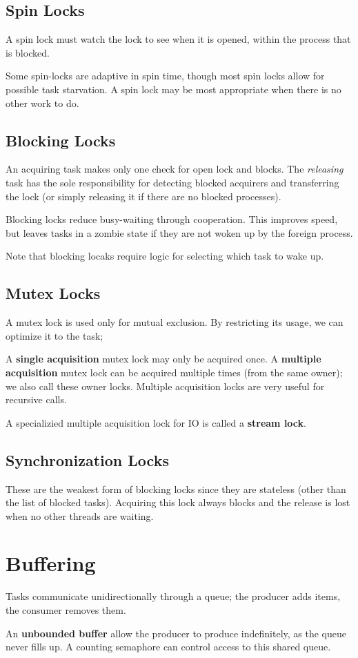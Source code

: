 \documentclass[12pt]{article}
\begin{document}
\subsection{Spin Locks}
A spin lock must watch the lock to see when it is opened, within the process that is blocked.

Some spin-locks are adaptive in spin time, though most spin locks allow for possible task starvation. A spin lock may be most appropriate when there is no other work to do.

\subsection{Blocking Locks}
An acquiring task makes only one check for open lock and blocks. The \textit{releasing} task has the sole responsibility for detecting blocked acquirers and transferring the lock (or simply releasing it if there are no blocked processes).

Blocking locks reduce busy-waiting through cooperation. This improves speed, but leaves tasks in a zombie state if they are not woken up by the foreign process.

Note that blocking locaks require logic for selecting which task to wake up.

\subsection{Mutex Locks}
A mutex lock is used only for mutual exclusion. By restricting its usage, we can optimize it to the task;

A {\bf single acquisition} mutex lock may only be acquired once. A {\bf multiple acquisition} mutex lock can be acquired multiple times (from the same owner); we also call these owner locks. Multiple acquisition locks are very useful for recursive calls.

A specializied multiple acquisition lock for IO is called a {\bf stream lock}.

\subsection{Synchronization Locks}
These are the weakest form of blocking locks since they are stateless (other than the list of blocked tasks). Acquiring this lock always blocks and the release is lost when no other threads are waiting.

\section{Buffering}
Tasks communicate unidirectionally through a queue; the producer adds items, the consumer removes them.

An {\bf unbounded buffer} allow the producer to produce indefinitely, as the queue never fills up. A counting semaphore can control access to this shared queue.
\end{document}
